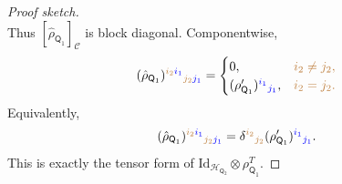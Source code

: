 \documentclass[
    aps,
    pra,
    reprint,
    superscriptaddress,
    nofootinbib
]{revtex4-2}
\theoremstyle{definition}
\theoremstyle{plain}
\begin{document}
\begin{proof}[Proof sketch]
\begin{equation}
        \end{equation}
        Thus $[\hat{\rho}_{\mathsf{Q}_{1}}]_{\mathcal{C}}$ is
        block diagonal. Componentwise,
        \begin{equation}
            (\hat{\rho}_{\mathsf{Q}_{1}})
            ^{\color{brown}i_{2}\color{blue}i_{1}}
            {}_{\color{brown}j_{2}\color{blue}j_{1}}
            =
            \begin{cases}
                0,
                &\color{brown}i_{2}\neq j_{2},\\
                (\rho'_{\mathsf{Q}_{1}})
                ^{\color{blue}i_{1}}{}_{\color{blue}j_{1}},
                &\color{brown}i_{2}=j_{2}.
            \end{cases}
        \end{equation}
        Equivalently,
        \begin{equation}
            (\hat{\rho}_{\mathsf{Q}_{1}})
            ^{\color{brown}i_{2}\color{blue}i_{1}}
            {}_{\color{brown}j_{2}\color{blue}j_{1}}
            =
            \delta^{\color{brown}i_{2}}{}_{\color{brown}j_{2}}
            (\rho'_{\mathsf{Q}_{1}})
            ^{\color{blue}i_{1}}{}_{\color{blue}j_{1}}.
            \label{eq:kronecker-expre}
        \end{equation}
        This is exactly the tensor form of
        $\mathrm{Id}_{\mathcal{H}_{\mathsf{Q}_{2}}}
        \otimes\rho_{\mathsf{Q}_{1}}^{T}$.


\end{proof}
\end{document}

